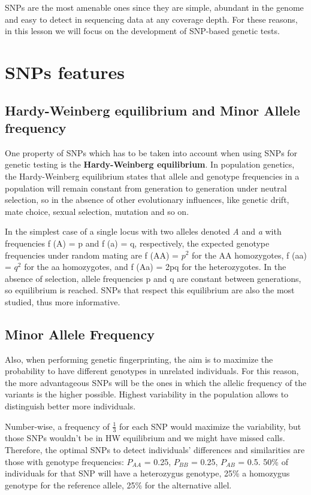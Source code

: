 SNPs are the most amenable ones since they are simple, abundant in the genome and easy to detect in sequencing data at any coverage depth. For these reasons, in this lesson we will focus on the development of SNP-based genetic tests.

\section*{SNPs features}

\subsection*{Hardy-Weinberg equilibrium and Minor Allele frequency}

One property of SNPs which has to be taken into account when using SNPs for genetic testing is the \textbf{Hardy-Weinberg equilibrium}. 
In population genetics, the Hardy-Weinberg equilibrium states that allele and genotype frequencies in a population will remain constant from generation to generation under neutral selection, so in the absence of other evolutionary influences, like genetic drift, mate choice, sexual selection, mutation and so on.

In the simplest case of a single locus with two alleles denoted \emph{A} and \emph{a} with frequencies f (A) = p and f (a) = q, respectively, the expected genotype frequencies under random mating are f (AA) = $p^{2}$ for the AA homozygotes, f (aa) = $q^{2}$ for the aa homozygotes, and f (Aa) = 2pq for the heterozygotes. In the absence of selection, allele frequencies p and q are constant between generations, so equilibrium is reached.
SNPs that respect this equilibrium are also the most studied, thus more informative. 

\subsection*{Minor Allele Frequency}

Also, when performing genetic fingerprinting, the aim is to maximize the probability to have different genotypes in unrelated individuals. 
For this reason, the more advantageous SNPs will be the ones in which the allelic frequency of the variants is the higher possible. Highest variability in the population allows to distinguish better more individuals. 

Number-wise, a frequency of $\frac{1}{3}$ for each SNP would maximize the variability, but those SNPs wouldn't be in HW equilibrium and we might have missed calls. 
Therefore, the optimal SNPs to detect individuals’ differences and similarities are those with genotype frequencies: $P_{AA}$ = 0.25, $P_{BB}$ = 0.25, $P_{AB}$ = 0.5. 50\% of individuals for that SNP will have a heterozygus genotype, 25\% a homozygus genotype for the reference allele, 25\% for the alternative allel.


